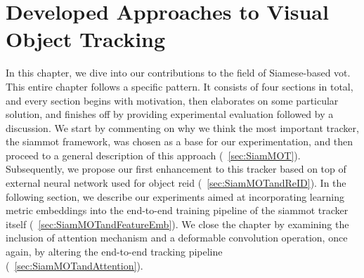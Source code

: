 \chapter{Developed Approaches to Visual Object Tracking}
\label{chap:DevelopedVisualTrackingApproaches}

In this chapter, we dive into our contributions to the field of Siamese-based \gls{vot}. This entire chapter follows a specific pattern. It consists of four sections in total, and every section begins with motivation, then elaborates on some particular solution, and finishes off by providing experimental evaluation followed by a discussion. We start by commenting on why we think the most important tracker, the \gls{siammot} framework, was chosen as a base for our experimentation, and then proceed to a general description of this approach (\sectiontext{}~\ref{sec:SiamMOT}). Subsequently, we propose our first enhancement to this tracker based on top of external neural network used for object \gls{reid} (\sectiontext{}~\ref{sec:SiamMOTandReID}). In the following section, we describe our experiments aimed at incorporating learning metric embeddings into the end-to-end training pipeline of the \gls{siammot} tracker itself (\sectiontext{}~\ref{sec:SiamMOTandFeatureEmb}). We close the chapter by examining the inclusion of attention mechanism and a deformable convolution operation, once again, by altering the end-to-end tracking pipeline (\sectiontext{}~\ref{sec:SiamMOTandAttention}).






